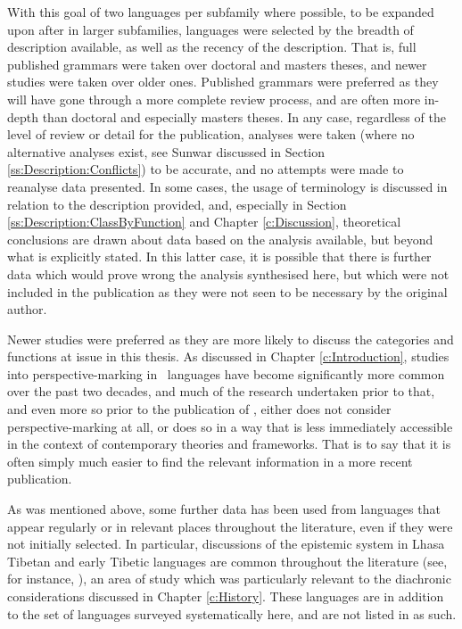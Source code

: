 With this goal of two languages per subfamily where possible, to be expanded upon after in larger subfamilies, languages were selected by the breadth of description available, as well as the recency of the description. That is, full published grammars were taken over doctoral and masters theses, and newer studies were taken over older ones. Published grammars were preferred as they will have gone through a more complete review process, and are often more in-depth than doctoral and especially masters theses. In any case, regardless of the level of review or detail for the publication, analyses were taken (where no alternative analyses exist, see Sunwar discussed in Section \ref{ss:Description:Conflicts}) to be accurate, and no attempts were made to reanalyse data presented. In some cases, the usage of terminology is discussed in relation to the description provided, and, especially in Section \ref{ss:Description:ClassByFunction} and Chapter \ref{c:Discussion}, theoretical conclusions are drawn about data based on the analysis available, but beyond what is explicitly stated. In this latter case, it is possible that there is further data which would prove wrong the analysis synthesised here, but which were not included in the publication as they were not seen to be necessary by the original author.

Newer studies were preferred as they are more likely to discuss the categories and functions at issue in this thesis. As discussed in Chapter \ref{c:Introduction}, studies into perspective-marking in \lfam\ languages have become significantly more common over the past two decades, and much of the research undertaken prior to that, and even more so prior to the publication of , either does not consider perspective-marking at all, or does so in a way that is less immediately accessible in the context of contemporary theories and frameworks. That is to say that it is often simply much easier to find the relevant information in a more recent publication.

As was mentioned above, some further data has been used from languages that appear regularly or in relevant places throughout the literature, even if they were not initially selected. In particular, discussions of the epistemic system in Lhasa Tibetan and early Tibetic languages are common throughout the literature (see, for instance, ), an area of study which was particularly relevant to the diachronic considerations discussed in Chapter \ref{c:History}. These languages are in addition to the set of languages surveyed systematically here, and are not listed in  as such.

